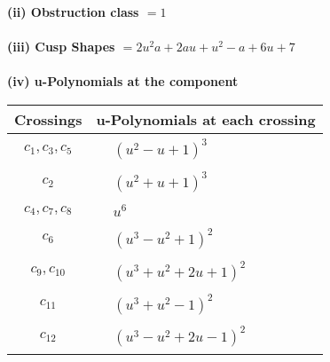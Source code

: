 \documentclass[1p]{elsarticle_modified}
\theoremstyle{definition}
\begin{document}
\flushleft \textbf{(ii) Obstruction class $= 1$}\\~\\
\flushleft \textbf{(iii) Cusp Shapes $= 2 u^2 a+2 a u+u^2- a+6 u+7$}\\~\\
\newpage\renewcommand{\arraystretch}{1}
\flushleft \textbf{(iv) u-Polynomials at the component}\newline \\
\begin{tabular}{m{50pt}|m{274pt}}
Crossings & \hspace{64pt}u-Polynomials at each crossing \\
\hline $$\begin{aligned}c_{1},c_{3},c_{5}\end{aligned}$$&$\begin{aligned}
&(u^2- u+1)^3
\end{aligned}$\\
\hline $$\begin{aligned}c_{2}\end{aligned}$$&$\begin{aligned}
&(u^2+u+1)^3
\end{aligned}$\\
\hline $$\begin{aligned}c_{4},c_{7},c_{8}\end{aligned}$$&$\begin{aligned}
&u^6
\end{aligned}$\\
\hline $$\begin{aligned}c_{6}\end{aligned}$$&$\begin{aligned}
&(u^3- u^2+1)^2
\end{aligned}$\\
\hline $$\begin{aligned}c_{9},c_{10}\end{aligned}$$&$\begin{aligned}
&(u^3+u^2+2 u+1)^2
\end{aligned}$\\
\hline $$\begin{aligned}c_{11}\end{aligned}$$&$\begin{aligned}
&(u^3+u^2-1)^2
\end{aligned}$\\
\hline $$\begin{aligned}c_{12}\end{aligned}$$&$\begin{aligned}
&(u^3- u^2+2 u-1)^2
\end{aligned}$\\
\hline
\end{tabular}\\~\\
\end{document}

